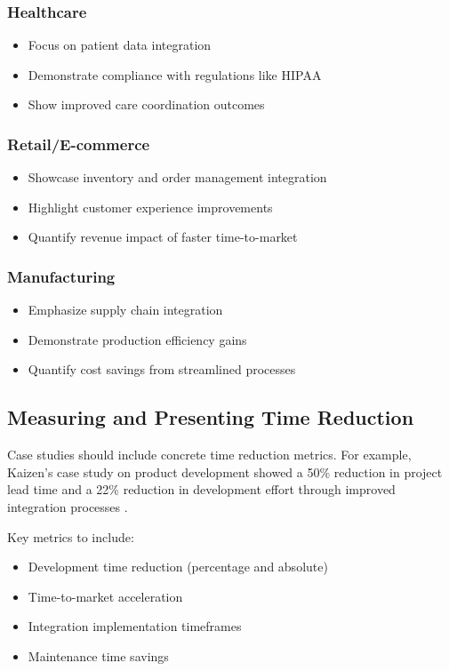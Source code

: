 \documentclass[11pt,a4paper]{article}
\begin{document}
\subsubsection{Healthcare}
\begin{itemize}
    \item Focus on patient data integration
    \item Demonstrate compliance with regulations like HIPAA
    \item Show improved care coordination outcomes
\end{itemize}

\subsubsection{Retail/E-commerce}
\begin{itemize}
    \item Showcase inventory and order management integration
    \item Highlight customer experience improvements
    \item Quantify revenue impact of faster time-to-market
\end{itemize}

\subsubsection{Manufacturing}
\begin{itemize}
    \item Emphasize supply chain integration
    \item Demonstrate production efficiency gains
    \item Quantify cost savings from streamlined processes
\end{itemize}

\subsection{Measuring and Presenting Time Reduction}

Case studies should include concrete time reduction metrics. For example, Kaizen's case study on product development showed a 50\% reduction in project lead time and a 22\% reduction in development effort through improved integration processes \cite{kaizen2023}.

Key metrics to include:
\begin{itemize}
    \item Development time reduction (percentage and absolute)
    \item Time-to-market acceleration
    \item Integration implementation timeframes
    \item Maintenance time savings
\end{itemize}
\end{document}

